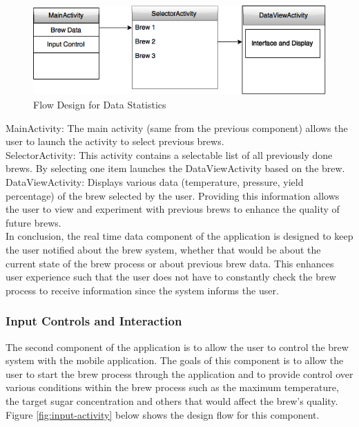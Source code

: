 \documentclass{article}
\begin{document}
\begin{figure}[H]
\begin{center}
\includegraphics[scale=0.70]{data-statistics.png}
\caption{Flow Design for Data Statistics}
\label{fig:data-statistics}
\end{center}
\end{figure}

\noindent MainActivity: The main activity (same from the previous component) allows the user to launch the activity to select previous brews. \\

\noindent SelectorActivity: This activity contains a selectable list of all previously done brews. By selecting one item launches the DataViewActivity based on the brew. \\

\noindent DataViewActivity: Displays various data (temperature, pressure, yield percentage) of the brew selected by the user.
Providing this information allows the user to view and experiment with previous brews to enhance the quality of future brews. \\

In conclusion, the real time data component of the application is designed to keep the user notified about the brew system, whether that would be about the current state of the brew process or about previous brew data. This enhances user experience such that the user does not have to constantly check the brew process to receive information since the system informs the user.

\subsubsection{Input Controls and Interaction}
The second component of the application is to allow the user to control the brew system with the mobile application. The goals of this component is to allow the user to start the brew process through the application and to provide control over various conditions within the brew process such as the maximum temperature, the target sugar concentration and others that would affect the brew's quality. Figure \ref{fig:input-activity} below shows the design flow for this component. \\
\end{document}
